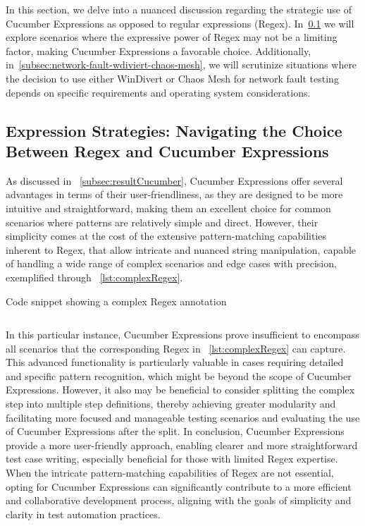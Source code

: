 In this section, we delve into a nuanced discussion regarding the strategic use of Cucumber Expressions as opposed to regular expressions (\ac{Regex}). In~\cref{subsec:expression-strategies} we will explore scenarios where the expressive power of \ac{Regex} may not be a limiting factor, making Cucumber Expressions a favorable choice. Additionally, in~\cref{subsec:network-fault-wdiviert-chaos-mesh}, we will scrutinize situations where the decision to use either WinDivert or Chaos Mesh for network fault testing depends on specific requirements and operating system considerations.

\subsection{Expression Strategies: Navigating the Choice Between \ac{Regex} and Cucumber Expressions}
\label{subsec:expression-strategies}

As discussed in ~\cref{subsec:resultCucumber}, Cucumber Expressions offer several advantages in terms of their user-friendliness, as they are designed to be more intuitive and straightforward, making them an excellent choice for common scenarios where patterns are relatively simple and direct. However, their simplicity comes at the cost of the extensive pattern-matching capabilities inherent to \ac{Regex}, that allow intricate and nuanced string manipulation, capable of handling a wide range of complex scenarios and edge cases with precision, exemplified through ~\cref{lst:complexRegex}. 

\begin{listing}[!ht]
\caption{Code snippet showing a complex \ac{Regex} annotation}
\label{lst:complexRegex}
\inputminted{java}{files/code/complexRegex.java}
\end{listing}

In this particular instance, Cucumber Expressions prove insufficient to encompass all scenarios that the corresponding \ac{Regex} in ~\cref{lst:complexRegex} can capture. This advanced functionality is particularly valuable in cases requiring detailed and specific pattern recognition, which might be beyond the scope of Cucumber Expressions. However, it also may be beneficial to consider splitting the complex step into multiple step definitions, thereby achieving greater modularity and facilitating more focused and manageable testing scenarios and evaluating the use of Cucumber Expressions after the split. In conclusion, Cucumber Expressions provide a more user-friendly approach, enabling clearer and more straightforward test case writing, especially beneficial for those with limited \ac{Regex} expertise. When the intricate pattern-matching capabilities of \ac{Regex} are not essential, opting for Cucumber Expressions can significantly contribute to a more efficient and collaborative development process, aligning with the goals of simplicity and clarity in test automation practices.


